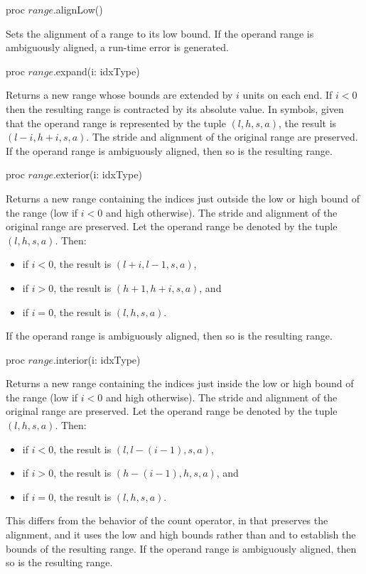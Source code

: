 \begin{protohead}
proc $range$.alignLow()
\end{protohead}
\begin{protobody}
Sets the alignment of a range to its low bound.
If the operand range is ambiguously aligned, a run-time error is generated.
\end{protobody}

\begin{protohead}
proc $range$.expand(i: idxType)
\end{protohead}
\begin{protobody}
Returns a new range whose bounds are extended by $i$ units on each end.  If $i <
0$ then the resulting range is contracted by its absolute value.  In symbols,
given that the operand range is represented by the tuple $(l,h,s,a)$, the result
is $(l-i,h+i,s,a)$.  The stride and alignment of the original range are preserved.
If the operand range is ambiguously aligned, then so is the resulting range.
\end{protobody}

\begin{protohead}
proc $range$.exterior(i: idxType)
\end{protohead}
\begin{protobody}
Returns a new range containing the indices just outside the low or high bound of
the range (low if $i < 0$ and high otherwise).  The stride and alignment of the
original range are preserved.  Let the operand range
be denoted by the tuple $(l,h,s,a)$.  Then:
\begin{itemize}
\item[] if $i < 0$, the result is $(l+i,l-1,s,a)$,
\item[] if $i > 0$, the result is $(h+1,h+i,s,a)$, and
\item[] if $i = 0$, the result is $(l,h,s,a)$.
\end{itemize}
If the operand range is ambiguously aligned, then so is the resulting range.
\end{protobody}

\begin{protohead}
proc $range$.interior(i: idxType)
\end{protohead}
\begin{protobody}
Returns a new range containing the indices just inside the low or high bound of
the range (low if $i < 0$ and high otherwise).  The stride and alignment of the
original range are preserved.  Let the operand range
be denoted by the tuple $(l,h,s,a)$.  Then:
\begin{itemize}
\item[] if $i < 0$, the result is $(l,l-(i-1),s,a)$,
\item[] if $i > 0$, the result is $(h-(i-1),h,s,a)$, and
\item[] if $i = 0$, the result is $(l,h,s,a)$.
\end{itemize}
This differs from the behavior of the count operator, in that 
preserves the alignment, and it uses the low and high bounds rather
than  and  to establish the bounds of the resulting range.
If the operand range is ambiguously aligned, then so is the resulting range.
\end{protobody}

